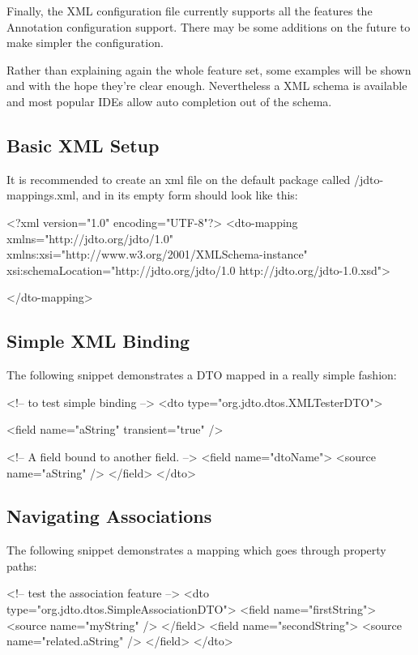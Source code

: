 \documentclass[11pt]{article}
\newcommand{\DEFAULTCONFIG}{/jdto-mappings.xml\xspace}
\begin{document}
Finally, the XML configuration file currently supports all the features the Annotation configuration support. There may be some additions on the future to make simpler the configuration.


Rather than explaining again the whole feature set, some examples will be shown and with the hope they're clear enough. Nevertheless a XML schema is available and most popular IDEs allow auto completion out of the schema.


\subsection{Basic XML Setup}

It is recommended to create an xml file on the default package called \DEFAULTCONFIG, and in its empty form should look like this:

\begin{xml}
<?xml version="1.0" encoding="UTF-8"?>
<dto-mapping 
    xmlns="http://jdto.org/jdto/1.0" 
    xmlns:xsi="http://www.w3.org/2001/XMLSchema-instance"
    xsi:schemaLocation="http://jdto.org/jdto/1.0 
                        http://jdto.org/jdto-1.0.xsd">
        
</dto-mapping>
\end{xml}


\subsection{Simple XML Binding}

The following snippet demonstrates a DTO mapped in a really simple fashion:

\begin{xml}
<!-- to test simple binding -->
<dto type="org.jdto.dtos.XMLTesterDTO">

    <field name="aString" transient="true" />

    <!-- A field bound to another field. -->
    <field name="dtoName">
        <source name="aString" />
    </field>
</dto>
\end{xml}

\subsection{Navigating Associations}

The following snippet demonstrates a mapping which goes through property paths:

\begin{xml}
<!-- test the association feature -->
<dto type="org.jdto.dtos.SimpleAssociationDTO">
    <field name="firstString">
        <source name="myString" />
    </field>
    <field name="secondString">
        <source name="related.aString" />
    </field>
</dto>
\end{xml}
\end{document}

